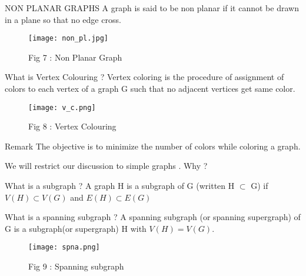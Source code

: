 \documentclass[12pt]{beamer}
\begin{document}
\begin{frame}
\begin{block}{NON PLANAR GRAPHS}
A graph is said to be non planar if it cannot be drawn in a plane so that no edge cross.
\end{block}
\begin{figure}
\centering
\texttt{[image: non\_pl.jpg]}
\caption{Fig 7 : Non Planar Graph}
\end{figure}
\end{frame}

\begin{frame}
\begin{block}{What is Vertex Colouring ?}
Vertex coloring is the procedure of assignment of colors to each vertex of a graph G such that no adjacent vertices get same color.
\end{block}
\begin{figure}
\centering
\texttt{[image: v\_c.png]}
\caption{Fig 8 : Vertex Colouring}
\end{figure}
\end{frame}

\begin{frame}
\begin{block}{Remark}
The objective is to minimize the number of colors while coloring a graph.
\end{block}
\end{frame}



\begin{frame}
\begin{large}
We will restrict our discussion to simple graphs . Why ?
\end{large}
\end{frame}

\begin{frame}
\begin{block}{What is a subgraph ? }
A graph H is a subgraph of G (written H $\subset $ G) if $V(H) \subset V(G)$ and $ E(H)\subset E(G)$
\end{block}
\end{frame}

\begin{frame}
\begin{block}{What is a spanning subgraph ? }
A spanning subgraph (or spanning supergraph) of G is
a subgraph(or supergraph) H with $V(H) = V(G)$.
\end{block}
\begin{figure}
\texttt{[image: spna.png]}
\caption{Fig 9 : Spanning subgraph}
\end{figure}

\end{frame}
\end{document}
